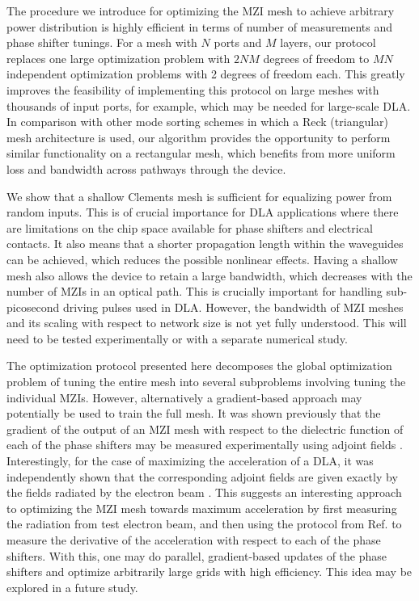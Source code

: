 The procedure we introduce for optimizing the MZI mesh to achieve arbitrary power distribution is highly efficient in terms of number of measurements and phase shifter tunings.  For a mesh with $N$ ports and $M$ layers, our protocol replaces one large optimization problem with $2NM$ degrees of freedom to $MN$ independent optimization problems with 2 degrees of freedom each.  This greatly improves the feasibility of implementing this protocol on large meshes with thousands of input ports, for example, which may be needed for large-scale DLA.  In comparison with other mode sorting schemes \cite{Annoni2017, Miller2013a} in which a Reck (triangular) mesh architecture is used, our algorithm provides the opportunity to perform similar functionality on a rectangular mesh, which benefits from more uniform loss and bandwidth across pathways through the device.

We show that a shallow Clements mesh is sufficient for equalizing power from random inputs.  This is of crucial importance for DLA applications where there are limitations on the chip space available for phase shifters and electrical contacts.  It also means that a shorter propagation length within the waveguides can be achieved, which reduces the possible nonlinear effects.  Having a shallow mesh also allows the device to retain a large bandwidth, which decreases with the number of MZIs in an optical path.  This is crucially important for handling sub-picosecond driving pulses used in DLA.  However, the bandwidth of MZI meshes and its scaling with respect to network size is not yet fully understood.  This will need to be tested experimentally or with a separate numerical study.

The optimization protocol presented here decomposes the global optimization problem of tuning the entire mesh into several subproblems involving tuning the individual MZIs.  However, alternatively a gradient-based approach may potentially be used to train the full mesh.  It was shown previously \cite{hughes2018training} that the gradient of the output of an MZI mesh with respect to the dielectric function of each of the phase shifters may be measured experimentally using adjoint fields \cite{veronis_method_2004}. Interestingly, for the case of maximizing the acceleration of a DLA, it was independently shown that the corresponding adjoint fields are given exactly by the fields radiated by the electron beam \cite{hughes_method_2017}.  This suggests an interesting approach to optimizing the MZI mesh towards maximum acceleration by first measuring the radiation from test electron beam, and then using the protocol from Ref. \cite{hughes2018training} to measure the derivative of the acceleration with respect to each of the phase shifters.  With this, one may do parallel, gradient-based updates of the phase shifters and optimize arbitrarily large grids with high efficiency. This idea may be explored in a future study.

